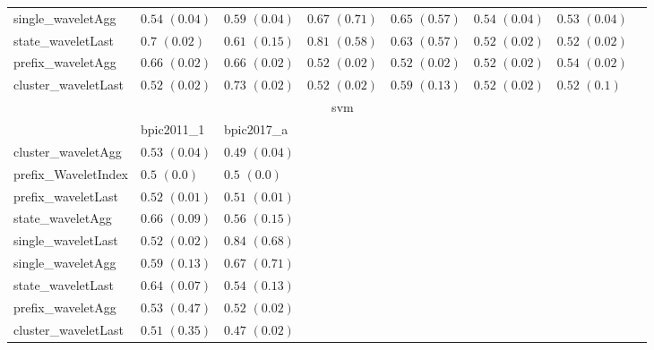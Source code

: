 \documentclass[twoside,11pt]{Latex/Classes/PhDthesisPSnPDF}
\begin{document}
\begin{table}[h]
{\begin{tabular}{llllllll}
			single\_waveletAgg & $0.54$ ${(0.04)}$ & $0.59$ ${(0.04)}$ & $0.67$ ${(0.71)}$ & $0.65$ ${(0.57)}$ & $0.54$ ${(0.04)}$ & $0.53$ ${(0.04)}$ \\
			state\_waveletLast & $0.7$ ${(0.02)}$ & $0.61$ ${(0.15)}$ & $0.81$ ${(0.58)}$ & $0.63$ ${(0.57)}$ & $0.52$ ${(0.02)}$ & $0.52$ ${(0.02)}$ \\
			prefix\_waveletAgg & $0.66$ ${(0.02)}$ & $0.66$ ${(0.02)}$ & $0.52$ ${(0.02)}$ & $0.52$ ${(0.02)}$ & $0.52$ ${(0.02)}$ & $0.54$ ${(0.02)}$ \\
			cluster\_waveletLast & $0.52$ ${(0.02)}$ & $0.73$ ${(0.02)}$ & $0.52$ ${(0.02)}$ & $0.59$ ${(0.13)}$ & $0.52$ ${(0.02)}$ & $0.52$ ${(0.1)}$ \\
			\bottomrule
			\toprule
			& \multicolumn{5}{c}{svm}
			\\
			& bpic2011\_1 & bpic2017\_a
			\\ \midrule
			cluster\_waveletAgg & $0.53$ ${(0.04)}$ & $0.49$ ${(0.04)}$ \\
			prefix\_WaveletIndex & $0.5$ ${(0.0)}$ & $0.5$ ${(0.0)}$ \\
			prefix\_waveletLast & $0.52$ ${(0.01)}$ & $0.51$ ${(0.01)}$ \\
			state\_waveletAgg & $0.66$ ${(0.09)}$ & $0.56$ ${(0.15)}$ \\
			single\_waveletLast & $0.52$ ${(0.02)}$ & $0.84$ ${(0.68)}$ \\
			single\_waveletAgg & $0.59$ ${(0.13)}$ & $0.67$ ${(0.71)}$ \\
			state\_waveletLast & $0.64$ ${(0.07)}$ & $0.54$ ${(0.13)}$ \\
			prefix\_waveletAgg & $0.53$ ${(0.47)}$ & $0.52$ ${(0.02)}$ \\
			cluster\_waveletLast & $0.51$ ${(0.35)}$ & $0.47$ ${(0.02)}$ \\
			\bottomrule
			
						
		\end{tabular}%
	}
\end{table}

			
			
			
			


\end{document}
